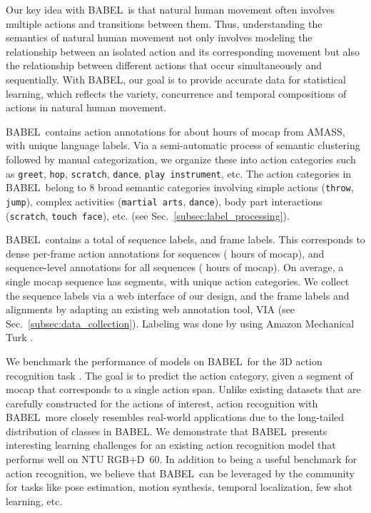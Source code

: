 \documentclass[final]{cvpr}
\def\babel{BABEL}
\def\ntu{NTU RGB+D}
\begin{document}
Our key idea with \babel~is that natural human movement often involves multiple actions and transitions between them. Thus, understanding the semantics of natural human movement not only involves modeling the relationship between an isolated action and its corresponding movement but also the relationship between different actions that occur simultaneously and sequentially. 
With \babel, our goal is to provide accurate data for statistical learning, which reflects the variety, concurrence and temporal compositions of actions in natural human movement. 

\babel~contains action annotations for about  hours of mocap from AMASS, with  unique language labels. 
Via a semi-automatic process of semantic clustering followed by manual categorization, we organize these into  action categories such as \texttt{greet}, \texttt{hop}, \texttt{scratch}, \texttt{dance}, \texttt{play instrument}, etc. 
The action categories in \babel~belong to 8 broad semantic categories involving simple actions (\texttt{throw}, \texttt{jump}), complex activities (\texttt{martial arts}, \texttt{dance}), body part interactions (\texttt{scratch}, \texttt{touch face}), etc. (see Sec.~\ref{subsec:label_processing}). 

\babel~contains a total of  sequence labels, and  frame labels. 
This corresponds to dense per-frame action annotations for  sequences ( hours of mocap), and sequence-level annotations for all  sequences ( hours of mocap). 
On average, a single mocap sequence has  segments, with  unique action categories. 
We collect the sequence labels via a web interface of our design, and the frame labels and alignments by adapting an existing web annotation tool, VIA \cite{dutta2019vgg} (see Sec.~\ref{subsec:data_collection}). 
Labeling was done by using Amazon Mechanical Turk \cite{amt}. 

We benchmark the performance of models on \babel~for the 3D action recognition task \cite{DBLP:conf/cvpr/ShahroudyLNW16}. 
The goal is to predict the action category, given a segment of mocap that corresponds to a single action span. 
Unlike existing datasets that are carefully constructed for the actions of interest, 
action recognition with \babel~more closely resembles real-world applications due to the long-tailed distribution of classes in \babel.
We demonstrate that \babel~presents interesting learning challenges for an existing action recognition model that performs well on \ntu~60. In addition to being a useful benchmark for action recognition, we believe that \babel~can be leveraged by the community for tasks like pose estimation, motion synthesis, temporal localization, few shot learning, etc. 
\end{document}
